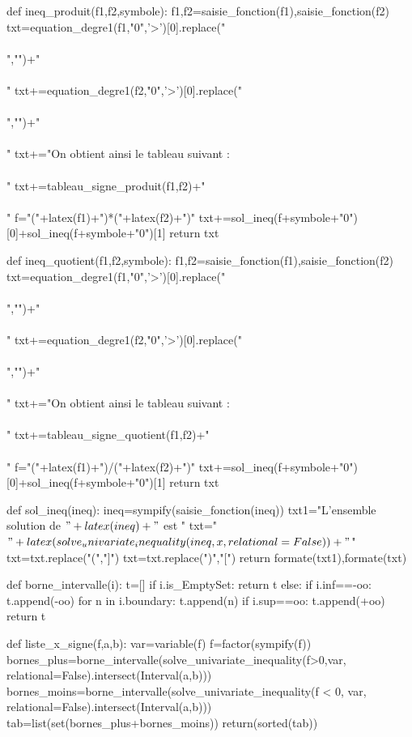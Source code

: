 \begin{pycode}
def ineq_produit(f1,f2,symbole):
    f1,f2=saisie_fonction(f1),saisie_fonction(f2)
    txt=equation_degre1(f1,"0",'>')[0].replace("\\\\","")+"\\\\"
    txt+=equation_degre1(f2,"0",'>')[0].replace("\\\\","")+"\\\\"
    txt+="On obtient ainsi le tableau suivant : \\\\"
    txt+=tableau_signe_produit(f1,f2)+"\\\\"
    f="("+latex(f1)+")*("+latex(f2)+")"
    txt+=sol_ineq(f+symbole+"0")[0]+sol_ineq(f+symbole+"0")[1]
    return txt

def ineq_quotient(f1,f2,symbole):
    f1,f2=saisie_fonction(f1),saisie_fonction(f2)
    txt=equation_degre1(f1,"0",'>')[0].replace("\\\\","")+"\\\\"
    txt+=equation_degre1(f2,"0",'>')[0].replace("\\\\","")+"\\\\"
    txt+="On obtient ainsi le tableau suivant : \\\\"
    txt+=tableau_signe_quotient(f1,f2)+"\\\\"
    f="("+latex(f1)+")/("+latex(f2)+")"
    txt+=sol_ineq(f+symbole+"0")[0]+sol_ineq(f+symbole+"0")[1]
    return txt

def sol_ineq(ineq):
    ineq=sympify(saisie_fonction(ineq))
    txt1="L'ensemble solution de $"+latex(ineq)+"$ est "
    txt="$"+latex(solve_univariate_inequality(ineq,x,relational=False))+"$"
    txt=txt.replace("(","]")
    txt=txt.replace(")","[")
    return formate(txt1),formate(txt)

def borne_intervalle(i):
    t=[]
    if i.is_EmptySet:
        return t
    else:
        if i.inf==-oo:
            t.append(-oo)
        for n in i.boundary:
            t.append(n)
        if i.sup==oo:
            t.append(+oo)
        return t

def liste_x_signe(f,a,b):
    var=variable(f)
    f=factor(sympify(f))
    bornes_plus=borne_intervalle(solve_univariate_inequality(f>0,var, relational=False).intersect(Interval(a,b)))
    bornes_moins=borne_intervalle(solve_univariate_inequality(f < 0, var, relational=False).intersect(Interval(a,b)))
    tab=list(set(bornes_plus+bornes_moins))
    return(sorted(tab))



\end{pycode}
